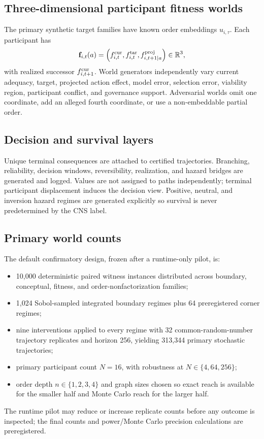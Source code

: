 \documentclass[11pt]{article}
\begin{document}
\subsection{Three-dimensional participant fitness worlds}

The primary synthetic target families have known order embeddings $u_{i,\tau}$. Each participant has
\begin{equation}
\mathbf f_{i,t}(a)=\left(f^{\rm cur}_{i,t},f^{\rm tar}_{i,t},f^{\rm proj}_{i,t+1\mid a}\right)\in\mathbb R^3,
\end{equation}
with realized successor $f^{\rm cur}_{i,t+1}$. World generators independently vary current adequacy, target, projected action effect, model error, selection error, viability region, participant conflict, and governance support. Adversarial worlds omit one coordinate, add an alleged fourth coordinate, or use a non-embeddable partial order.

\subsection{Decision and survival layers}

Unique terminal consequences are attached to certified trajectories. Branching, reliability, decision windows, reversibility, realization, and hazard bridges are generated and logged. Values are not assigned to paths independently; terminal participant displacement induces the decision view. Positive, neutral, and inversion hazard regimes are generated explicitly so survival is never predetermined by the CNS label.

\subsection{Primary world counts}

The default confirmatory design, frozen after a runtime-only pilot, is:
\begin{itemize}
\item 10,000 deterministic paired witness instances distributed across boundary, conceptual, fitness, and order-nonfactorization families;
\item 1,024 Sobol-sampled integrated boundary regimes plus 64 preregistered corner regimes;
\item nine interventions applied to every regime with 32 common-random-number trajectory replicates and horizon 256, yielding 313,344 primary stochastic trajectories;
\item primary participant count $N=16$, with robustness at $N\in\{4,64,256\}$;
\item order depth $n\in\{1,2,3,4\}$ and graph sizes chosen so exact reach is available for the smaller half and Monte Carlo reach for the larger half.
\end{itemize}
The runtime pilot may reduce or increase replicate counts before any outcome is inspected; the final counts and power/Monte Carlo precision calculations are preregistered.
\end{document}

